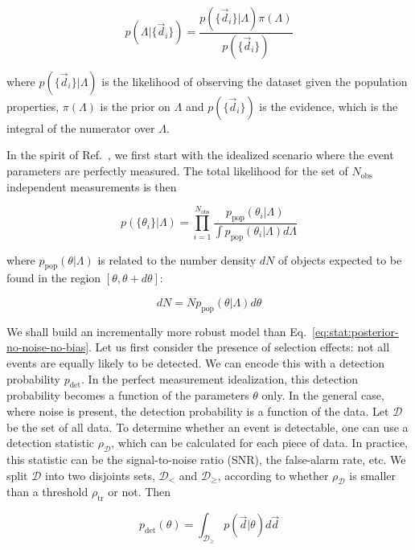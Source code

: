 \documentclass[%
preprint,
nofootinbib,
 amsmath,amssymb,
 aps,
]{revtex4-2}
\newcommand{\given}[2]{p( #1 | #2 )}
\newcommand{\ppop}[0]{p_{\text{pop}}}
\newcommand{\pdet}[0]{p_{\text{det}}}
\newcommand{\nobs}[0]{N_{\text{obs}}}
\begin{document}
\begin{equation}
	\given{\Lambda}{\{\vec{d}_i \}} =
	\frac{\given{\{\vec{d}_i \}}{\Lambda} \pi(\Lambda)}{p(\{\vec{d}_i \})}
\end{equation}

where $\given{\{\vec{d}_i \}}{\Lambda}$ is the likelihood of observing the dataset given the
population properties, $\pi(\Lambda)$ is the prior on $\Lambda$ and $p(\{\vec{d}_i \})$ is the
evidence, which is the integral of the numerator over $\Lambda$.

In the spirit of Ref.~, we first start with the idealized scenario where
the event parameters are perfectly measured. The total likelihood for the set of $\nobs$
independent measurements is then

\begin{equation}
	\label{eq:stat:posterior-no-noise-no-bias}
	\given{\{ \theta_i \}}{\Lambda} =
	\prod_{i=1}^{\nobs} \frac{\ppop(\theta_i | \Lambda)}{\int \ppop(\theta_i | \Lambda) d\Lambda}
\end{equation}

where $\ppop(\theta | \Lambda)$ is related to the number density $dN$ of objects expected to be
found in the region $[\theta, \theta + d\theta]$:

\begin{equation}
	\label{eq:stat:ppop}
	dN = N \ppop(\theta | \Lambda) d\theta
\end{equation}

We shall build an incrementally more robust model than
Eq.~\eqref{eq:stat:posterior-no-noise-no-bias}. Let us first consider the presence of selection
effects: not all events are equally likely to be detected. We can encode this with a detection
probability $\pdet$. In the perfect measurement idealization, this detection probability becomes a
function of the parameters $\theta$ only. In the general case, where noise is present, the
detection probability is a function of the data. Let $\mathcal{D}$ be the set of all data. To
determine whether an event is detectable, one can use a detection statistic $\rho_{\mathcal{D}}$,
which can be calculated for each piece of data. In practice, this statistic can be the
signal-to-noise ratio (SNR), the false-alarm rate, etc. We split $\mathcal{D}$ into two disjoints
sets, $\mathcal{D}_<$ and $\mathcal{D}_\geq$, according to whether $\rho_\mathcal{D}$ is smaller
than a threshold $\rho_{\text{tr}}$ or not. Then

\begin{equation}
	\label{eq:stat:detection-prob}
	\pdet(\theta) = \int_{\mathcal{D}_\geq} \given{\vec{d}}{\theta}d\vec{d}
\end{equation}
\end{document}
